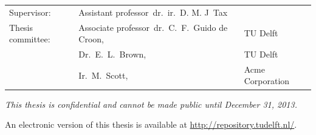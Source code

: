 \begin{titlepage}
\begin{center}
		\begin{tabular}{lll}
			Supervisor: & Assistant professor\ dr.\ ir.\ D. M. J\ Tax \\
			Thesis committee:
			& Associate professor\ dr.\ C.\ F.\ Guido de Croon, & TU Delft \\
			& Dr.\ E.\ L.\ Brown, & TU Delft \\
			& Ir.\ M.\ Scott, & Acme Corporation
		\end{tabular}
		
		\bigskip
		\bigskip
		\emph{This thesis is confidential and cannot be made public until December 31, 2013.}
		
		\bigskip
		\bigskip
		An electronic version of this thesis is available at \url{http://repository.tudelft.nl/}.
		
	\end{center}
	
\end{titlepage}

